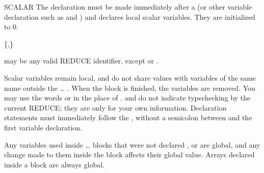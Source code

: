 \begin{Declaration}{SCALAR}
The  declaration must be made immediately after a
 (or other variable declaration such as 
and ) and declares local scalar variables.  They are
initialized to 0.
\begin{Syntax}
 \{,\}\optional
\end{Syntax}

 may be any valid REDUCE identifier, except  or
.

\begin{Comments}
Scalar variables remain local, and do not share values with variables of
the same name outside the \ldots{} .
When the block is finished, the variables are removed.  You may use the
words  or  in the place of .
 and  do not indicate typechecking by the current
REDUCE; they are only for your own information.  Declaration statements
must immediately follow the , without a semicolon between
 and the first variable declaration.

Any variables used inside \ldots{} blocks that were not
declared ,  or  are global, and any
change made to them inside the block affects their global value.  Arrays
declared inside a block are always global.
\end{Comments}
\end{Declaration}


